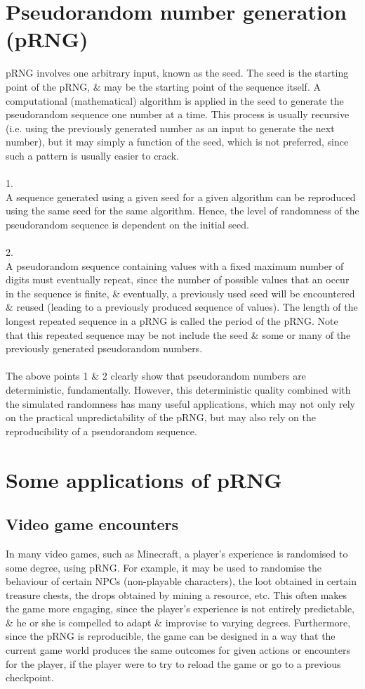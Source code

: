 \section{Pseudorandom number generation (pRNG)}
pRNG involves one arbitrary input, known as the seed. The seed is the starting point of the pRNG, \& may be the starting point of the sequence itself. A computational (mathematical) algorithm is applied in the seed to generate the pseudorandom sequence one number at a time. This process is usually recursive (i.e. using the previously generated number as an input to generate the next number), but it may simply a function of the seed, which is not preferred, since such a pattern is usually easier to crack.
\\~\\
1.\\
A sequence generated using a given seed for a given algorithm can be reproduced using the same seed for the same algorithm. Hence, the level of randomness of the pseudorandom sequence is dependent on the initial seed.
\\~\\
2.\\
A pseudorandom sequence containing values with a fixed maximum number of digits must eventually repeat, since the number of possible values that an occur in the sequence is finite, \& eventually, a previously used seed will be encountered \& reused (leading to a previously produced sequence of values). The length of the longest repeated sequence in a pRNG is called the period of the pRNG. Note that this repeated sequence may be not include the seed \& some or many of the previously generated pseudorandom numbers.
\\~\\
The above points 1 \& 2 clearly show that pseudorandom numbers are deterministic, fundamentally. However, this deterministic quality combined with the simulated randomness has many useful applications, which may not only rely on the practical unpredictability of the pRNG, but may also rely on the reproducibility of a pseudorandom sequence.

\section{Some applications of pRNG}
\subsection{Video game encounters}
In many video games, such as Minecraft, a player's experience is randomised to some degree, using pRNG. For example, it may be used to randomise the behaviour of certain NPCs (non-playable characters), the loot obtained in certain treasure chests, the drops obtained by mining a resource, etc. This often makes the game more engaging, since the player's experience is not entirely predictable, \& he or she is compelled to adapt \& improvise to varying degrees. Furthermore, since the pRNG is reproducible, the game can be designed in a way that the current game world produces the same outcomes for given actions or encounters for the player, if the player were to try to reload the game or go to a previous checkpoint.

